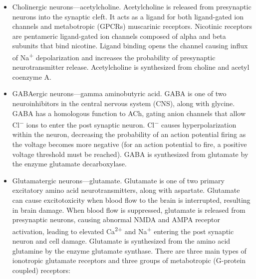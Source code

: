\documentclass[]{book}
\providecommand{\tightlist}{%
  \setlength{\itemsep}{0pt}\setlength{\parskip}{0pt}}
\begin{document}
\begin{itemize}
\tightlist
\item
  Cholinergic neurons---acetylcholine. Acetylcholine is released from presynaptic neurons into the synaptic cleft. It acts as a ligand for both ligand-gated ion channels and metabotropic (GPCRs) muscarinic receptors. Nicotinic receptors are pentameric ligand-gated ion channels composed of alpha and beta subunits that bind nicotine. Ligand binding opens the channel causing influx of Na\textsuperscript{+} depolarization and increases the probability of presynaptic neurotransmitter release. Acetylcholine is synthesized from choline and acetyl coenzyme A.
\item
  GABAergic neurons---gamma aminobutyric acid. GABA is one of two neuroinhibitors in the central nervous system (CNS), along with glycine. GABA has a homologous function to ACh, gating anion channels that allow Cl\textsuperscript{−} ions to enter the post synaptic neuron. Cl\textsuperscript{−} causes hyperpolarization within the neuron, decreasing the probability of an action potential firing as the voltage becomes more negative (for an action potential to fire, a positive voltage threshold must be reached). GABA is synthesized from glutamate by the enzyme glutamate decarboxylase.
\item
  Glutamatergic neurons---glutamate. Glutamate is one of two primary excitatory amino acid neurotransmitters, along with aspartate. Glutamate can cause excitotoxicity when blood flow to the brain is interrupted, resulting in brain damage. When blood flow is suppressed, glutamate is released from presynaptic neurons, causing abnormal NMDA and AMPA receptor activation, leading to elevated Ca\textsuperscript{2+} and Na\textsuperscript{+} entering the post synaptic neuron and cell damage. Glutamate is synthesized from the amino acid glutamine by the enzyme glutamate synthase. There are three main types of ionotropic glutamate receptors and three groups of metabotropic (G-protein coupled) receptors:


\end{itemize}
\end{document}

